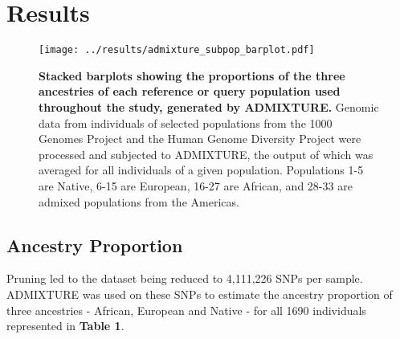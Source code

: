 \documentclass[11pt]{article}
\begin{document}
\section{Results}











\begin{figure}[htb!]%
    \centering
    \texttt{[image: 
        ../results/admixture\_subpop\_barplot.pdf]} 
    \vspace{-0.2cm}
    \caption{\textbf{
        Stacked barplots showing the proportions of the three ancestries of each reference or query population used throughout the study, generated by ADMIXTURE.
    }
        Genomic data from individuals of selected populations from the 1000 Genomes Project and the Human Genome Diversity Project were processed and subjected to ADMIXTURE, the output of which was averaged for all individuals of a given population. Populations 1-5 are Native, 6-15 are European, 16-27 are African, and 28-33 are admixed populations from the Americas.
    }
\end{figure}

\subsection{Ancestry Proportion}

Pruning led to the dataset being reduced to 4,111,226 SNPs per sample. ADMIXTURE was used on these SNPs to estimate the ancestry proportion of three ancestries - African, European and Native - for all 1690 individuals represented in \textbf{Table 1}.
\end{document}
